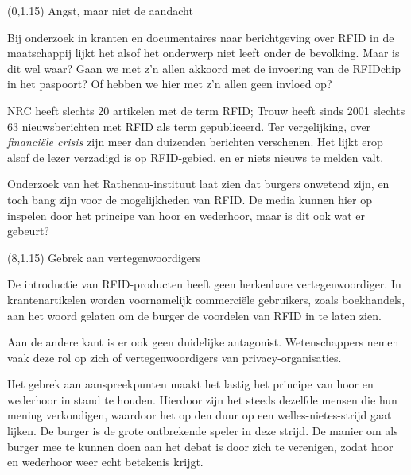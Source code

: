 \documentclass[a2]{a0poster}
\begin{document}
%
\begin{textblock}{7}(0,1.15)
{\LARGE\color{DarkBlue} Angst, maar niet de aandacht} \small

Bij onderzoek in kranten en documentaires naar berichtgeving over RFID in de maatschappij lijkt het alsof het onderwerp niet leeft onder de
bevolking. Maar is dit wel waar? Gaan we met z'n allen akkoord met de invoering van de RFIDchip in het paspoort? Of hebben we hier met z'n
allen geen invloed op?

NRC heeft slechts 20 artikelen met de term RFID; Trouw heeft sinds 2001 slechts 63 nieuwsberichten met RFID als term gepubliceerd. Ter
vergelijking, over \emph{financi\"ele crisis} zijn meer dan duizenden berichten verschenen. Het lijkt erop alsof de lezer verzadigd is op
RFID-gebied, en er niets nieuws te melden valt.

Onderzoek van het Rathenau-instituut laat zien dat burgers onwetend zijn, en toch bang zijn voor de mogelijkheden van RFID. De media kunnen
hier op inspelen door het principe van hoor en wederhoor, maar is dit ook wat er gebeurt?
\end{textblock}

\begin{textblock}{7}(8,1.15)
{\LARGE\color{DarkBlue} Gebrek aan vertegenwoordigers} \small

De introductie van RFID-producten heeft geen herkenbare vertegenwoordiger. In krantenartikelen worden voornamelijk commerci\"ele
gebruikers, zoals boekhandels, aan het woord gelaten om de burger de voordelen van RFID in te laten zien.

Aan de andere kant is er ook geen duidelijke antagonist. Wetenschappers nemen vaak deze rol op zich of vertegenwoordigers van
privacy-organisaties.

Het gebrek aan aanspreekpunten maakt het lastig het principe van hoor en wederhoor in stand te houden. Hierdoor zijn het steeds dezelfde
mensen die hun mening verkondigen, waardoor het op den duur op een welles-nietes-strijd gaat lijken. De burger is de grote ontbrekende
speler in deze strijd. De manier om als burger mee te kunnen doen aan het debat is door zich te verenigen, zodat hoor en wederhoor weer
echt betekenis krijgt.
\end{textblock}
\end{document}
